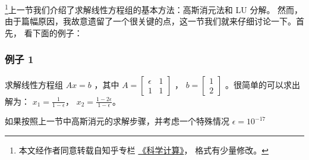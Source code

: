 

\footnote{本文经作者同意转载自知乎专栏 \href{https://www.zhihu.com/column/c_1226443594048942080}{《科学计算》}， 格式有少量修改。}上一节我们介绍了求解线性方程组的基本方法：高斯消元法和 LU 分解。 然而，由于篇幅原因，我故意遗留了一个很关键的点，这一节我们就来仔细讨论一下。首先， 看下面的例子：

\subsubsection{例子 1}

求解线性方程组  $Ax=b$  ，其中  $A=\begin{bmatrix} \epsilon & 1\\ 1 & 1 \end{bmatrix}$  ，  $b=\begin{bmatrix}  1\\  2 \end{bmatrix}$  。很简单的可以求出解为：  $x_1=\frac{1}{1-\epsilon}$， $x_2=\frac{1-2\epsilon}{1-\epsilon}$。

如果按照上一节中高斯消元的求解步骤，并考虑一个特殊情况  $\epsilon=10^{-17}$  

